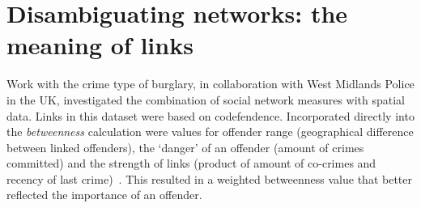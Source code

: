 \documentclass[conference]{IEEEtran}
\theoremstyle{definition}
\begin{document}




\section{Disambiguating networks: the meaning of links}\label{sec:disambiguating}
Work with the crime type of burglary, in collaboration with West
Midlands Police in the UK, investigated the combination of social
network measures with spatial data. Links in this dataset were based
on codefendence. Incorporated directly into the \emph{betweenness}
calculation were values for offender range (geographical difference
between linked offenders), the `danger' of an offender (amount of
crimes committed) and the strength of links (product of amount of
co-crimes and recency of last crime)~\cite{OatleyEwart2005}. This
resulted in a weighted betweenness value that better reflected the
importance of an offender.

\end{document}
